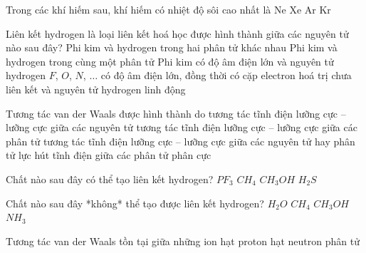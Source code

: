\begin{ex}
	Trong các khí hiếm sau, khí hiếm có nhiệt độ sôi cao nhất là
	\choice
	{Ne}
	{\True Xe}
	{Ar}
	{Kr}
\end{ex}

\begin{ex}
	Liên kết hydrogen là loại liên kết hoá học được hình thành giữa các
	nguyên tử nào sau đây?
	\choice
	{Phi kim và hydrogen trong hai phân tử khác nhau}
	{Phi kim và hydrogen trong cùng một phân tử}
	{Phi kim có độ âm điện lớn và nguyên tử hydrogen}
	{\True $F$, $O$, $N$, $\ldots$ có độ âm điện lớn, đồng thời có cặp electron hoá trị chưa liên kết
		và nguyên tử hydrogen linh động}
	\loigiai{}
\end{ex}

\begin{ex}
	Tương tác van der Waals được hình thành do
	\choice
	{tương tác tĩnh điện lưỡng cực – lưỡng cực giữa các nguyên tử}
	{tương tác tĩnh điện lưỡng cực – lưỡng cực giữa các phân tử}
	{\True tương tác tĩnh điện lưỡng cực – lưỡng cực giữa các nguyên tử hay phân tử}
	{lực hút tĩnh điện giữa các phân tử phân cực}
	\loigiai{}
\end{ex}

\begin{ex}
	Chất nào sau đây có thể tạo liên kết hydrogen?
	\choice
	{$PF_3$}
	{$CH_4$}
	{\True $CH_3OH$}
	{$H_2S$}
	\loigiai{}
\end{ex}

\begin{ex}
	Chất nào sau đây *không* thể tạo được liên kết hydrogen?
	\choice
	{$H_2O$}
	{\True $CH_4$}
	{$CH_3OH$}
	{$NH_3$}
	\loigiai{}
\end{ex}

\begin{ex}
	Tương tác van der Waals tồn tại giữa những
	\choice
	{ion}
	{hạt proton}
	{hạt neutron}
	{\True phân tử}
	\loigiai{}
\end{ex}

